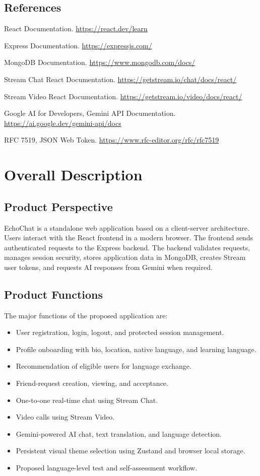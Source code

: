 \documentclass[12pt,a4paper]{report}
\begin{document}
\section{References}
\begin{enumerate}[label={[}\arabic*{]}]
\item React Documentation. \url{https://react.dev/learn}
\item Express Documentation. \url{https://expressjs.com/}
\item MongoDB Documentation. \url{https://www.mongodb.com/docs/}
\item Stream Chat React Documentation. \url{https://getstream.io/chat/docs/react/}
\item Stream Video React Documentation. \url{https://getstream.io/video/docs/react/}
\item Google AI for Developers, Gemini API Documentation. \url{https://ai.google.dev/gemini-api/docs}
\item RFC 7519, JSON Web Token. \url{https://www.rfc-editor.org/rfc/rfc7519}
\end{enumerate}

\chapter{Overall Description}
\section{Product Perspective}
EchoChat is a standalone web application based on a client-server architecture. Users interact with the React frontend in a modern browser. The frontend sends authenticated requests to the Express backend. The backend validates requests, manages session security, stores application data in MongoDB, creates Stream user tokens, and requests AI responses from Gemini when required.

\section{Product Functions}
The major functions of the proposed application are:
\begin{itemize}[leftmargin=0.45in]
\item User registration, login, logout, and protected session management.
\item Profile onboarding with bio, location, native language, and learning language.
\item Recommendation of eligible users for language exchange.
\item Friend-request creation, viewing, and acceptance.
\item One-to-one real-time chat using Stream Chat.
\item Video calls using Stream Video.
\item Gemini-powered AI chat, text translation, and language detection.
\item Persistent visual theme selection using Zustand and browser local storage.
\item Proposed language-level test and self-assessment workflow.
\end{itemize}
\end{document}
